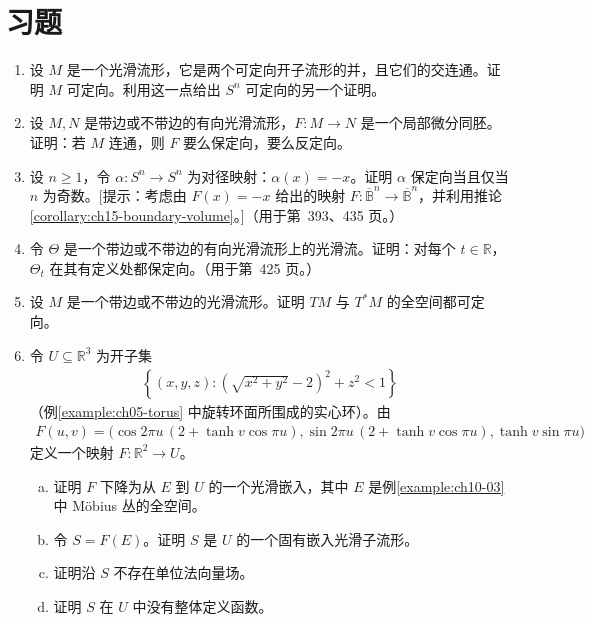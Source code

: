\documentclass[../../main.tex]{subfiles}
\begin{document}
\section{习题}\label{section:ch15-problems}

\begin{enumerate}
\item\label{exercise:ch15-01b} 设 $M$ 是一个光滑流形，它是两个可定向开子流形的并，且它们的交连通。证明 $M$ 可定向。利用这一点给出 $S^n$ 可定向的另一个证明。

\item\label{exercise:ch15-02} 设 $M,N$ 是带边或不带边的有向光滑流形，$F:M\to N$ 是一个局部微分同胚。证明：若 $M$ 连通，则 $F$ 要么保定向，要么反定向。

\item\label{exercise:ch15-03} 设 $n\geqslant1$，令 $\alpha:S^n\to S^n$ 为对径映射：$\alpha(x)=-x$。证明 $\alpha$ 保定向当且仅当 $n$ 为奇数。[提示：考虑由 $F(x)=-x$ 给出的映射 $F:\overline{\mathbb B}^n\to\overline{\mathbb B}^n$，并利用推论\ref{corollary:ch15-boundary-volume}。]（用于第~393、435 页。）

\item\label{exercise:ch15-04b} 令 $\Theta$ 是一个带边或不带边的有向光滑流形上的光滑流。证明：对每个 $t\in\mathbb{R}$，$\Theta_t$ 在其有定义处都保定向。（用于第~425 页。）

\item\label{exercise:ch15-05} 设 $M$ 是一个带边或不带边的光滑流形。证明 $TM$ 与 $T^*M$ 的全空间都可定向。

\item\label{exercise:ch15-06} 令 $U\subseteq\mathbb{R}^3$ 为开子集
\begin{align*}
\left\{(x,y,z):\left(\sqrt{x^2+y^2}-2\right)^2+z^2<1\right\}
\end{align*}
（例\ref{example:ch05-torus} 中旋转环面所围成的实心环）。由
\begin{align*}
F(u,v)=\bigl(\cos 2\pi u\,(2+\tanh v\cos\pi u),\sin 2\pi u\,(2+\tanh v\cos\pi u),\tanh v\sin\pi u\bigr)
\end{align*}
定义一个映射 $F:\mathbb{R}^2\to U$。
\begin{enumerate}[(a)]
\item 证明 $F$ 下降为从 $E$ 到 $U$ 的一个光滑嵌入，其中 $E$ 是例\ref{example:ch10-03} 中 Möbius 丛的全空间。
\item 令 $S=F(E)$。证明 $S$ 是 $U$ 的一个固有嵌入光滑子流形。
\item 证明沿 $S$ 不存在单位法向量场。
\item 证明 $S$ 在 $U$ 中没有整体定义函数。
\end{enumerate}


\end{enumerate}
\end{document}
